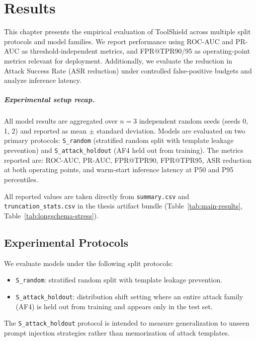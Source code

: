 \chapter{Results}
\label{sec:results}

This chapter presents the empirical evaluation of ToolShield across multiple split protocols and model families. We report performance using ROC-AUC and PR-AUC as threshold-independent metrics, and FPR@TPR90/95 as operating-point metrics relevant for deployment. Additionally, we evaluate the reduction in Attack Success Rate (ASR reduction) under controlled false-positive budgets and analyze inference latency.

\paragraph{Experimental setup recap.}
All model results are aggregated over $n{=}3$ independent random seeds (seeds 0, 1, 2) and reported as mean $\pm$ standard deviation. Models are evaluated on two primary protocols: \texttt{S\_random} (stratified random split with template leakage prevention) and \texttt{S\_attack\_holdout} (AF4 held out from training). The metrics reported are: ROC-AUC, PR-AUC, FPR@TPR90, FPR@TPR95, ASR reduction at both operating points, and warm-start inference latency at P50 and P95 percentiles.

All reported values are taken directly from \texttt{summary.csv} and \texttt{truncation\_stats.csv} in the thesis artifact bundle (Table~\ref{tab:main-results}, Table~\ref{tab:longschema-stress}).

\section{Experimental Protocols}
\label{subsec:protocols}

We evaluate models under the following split protocols:

\begin{itemize}
    \item \texttt{S\_random}: stratified random split with template leakage prevention.
    \item \texttt{S\_attack\_holdout}: distribution shift setting where an entire attack family (AF4) is held out from training and appears only in the test set.
\end{itemize}

The \texttt{S\_attack\_holdout} protocol is intended to measure generalization to unseen prompt injection strategies rather than memorization of attack templates.

